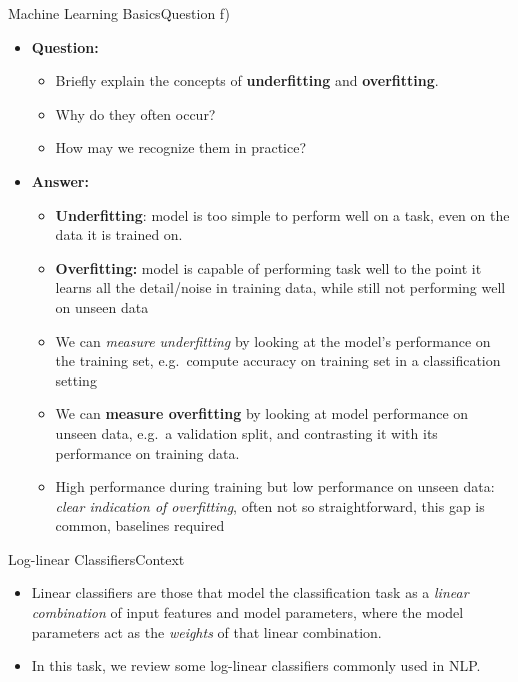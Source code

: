 \documentclass[t]{beamer}
\begin{document}
\begin{frame}{Machine Learning Basics}{Question f)}
    \begin{itemize}
        \item \textbf{Question:}
              \begin{itemize}
                  \item Briefly explain the concepts of \textbf{underfitting}
                        and \textbf{overfitting}.
                  \item Why do they often occur?
                  \item How may we recognize them in practice?
              \end{itemize}
              \pause
        \item \textbf{Answer:}
              \begin{itemize}
                  \item \textbf{Underfitting}: model is too simple to perform
                        well on a task, even on the data it is trained on.
                  \item \textbf{Overfitting:} model is capable of
                        performing task well to the point it learns
                        all the detail/noise in training data, while still not
                        performing well on unseen data
                  \item We can \emph{measure underfitting} by looking at the
                        model's performance on the training set, e.g.\ compute
                        accuracy on training set in a classification setting
                  \item We can \textbf{measure overfitting} by looking at
                        model performance on unseen data, e.g.\ a validation
                        split, and contrasting it with its performance on
                        training data.
                  \item High performance during training but low performance on
                        unseen data: \emph{clear indication of overfitting},
                        often not so straightforward, this gap is common,
                        baselines required
              \end{itemize}
    \end{itemize}
\end{frame}

\begin{frame}{Log-linear Classifiers}{Context}
    \begin{itemize}
        \item Linear classifiers are those that model the classification task as
              a \emph{linear combination} of input features and model
              parameters, where the model parameters act as the \emph{weights} of
              that linear combination.
        \item In this task, we review some log-linear classifiers commonly used
              in NLP.
    \end{itemize}
\end{frame}
\end{document}
